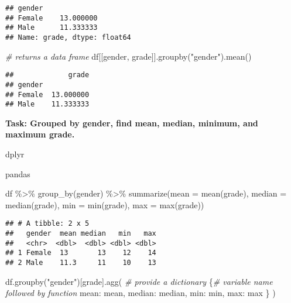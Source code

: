 \documentclass[
]{book}
\newenvironment{Shaded}{\begin{snugshade}}{\end{snugshade}}
\newcommand{\AttributeTok}[1]{\textcolor[rgb]{0.77,0.63,0.00}{#1}}
\newcommand{\CommentTok}[1]{\textcolor[rgb]{0.56,0.35,0.01}{\textit{#1}}}
\newcommand{\FunctionTok}[1]{\textcolor[rgb]{0.00,0.00,0.00}{#1}}
\newcommand{\NormalTok}[1]{#1}
\newcommand{\SpecialCharTok}[1]{\textcolor[rgb]{0.00,0.00,0.00}{#1}}
\newcommand{\StringTok}[1]{\textcolor[rgb]{0.31,0.60,0.02}{#1}}
\begin{document}
\begin{verbatim}
## gender
## Female    13.000000
## Male      11.333333
## Name: grade, dtype: float64
\end{verbatim}

\begin{Shaded}
\begin{Highlighting}[]
\CommentTok{\# returns a data frame}
\NormalTok{df[[}\StringTok{\textquotesingle{}gender\textquotesingle{}}\NormalTok{, }\StringTok{\textquotesingle{}grade\textquotesingle{}}\NormalTok{]].groupby(}\StringTok{"gender"}\NormalTok{).mean()}
\end{Highlighting}
\end{Shaded}

\begin{verbatim}
##             grade
## gender           
## Female  13.000000
## Male    11.333333
\end{verbatim}

{\textbf{Task: Grouped by gender, find mean, median, minimum, and maximum grade.
}}

dplyr

pandas

\begin{Shaded}
\begin{Highlighting}[]
\NormalTok{df }\SpecialCharTok{\%\textgreater{}\%} 
  \FunctionTok{group\_by}\NormalTok{(gender) }\SpecialCharTok{\%\textgreater{}\%} 
  \FunctionTok{summarize}\NormalTok{(}\AttributeTok{mean =} \FunctionTok{mean}\NormalTok{(grade),}
            \AttributeTok{median =} \FunctionTok{median}\NormalTok{(grade),}
            \AttributeTok{min =} \FunctionTok{min}\NormalTok{(grade),}
            \AttributeTok{max =} \FunctionTok{max}\NormalTok{(grade))}
\end{Highlighting}
\end{Shaded}

\begin{verbatim}
## # A tibble: 2 x 5
##   gender  mean median   min   max
##   <chr>  <dbl>  <dbl> <dbl> <dbl>
## 1 Female  13       13    12    14
## 2 Male    11.3     11    10    13
\end{verbatim}

\begin{Shaded}
\begin{Highlighting}[]
\NormalTok{df.groupby(}\StringTok{"gender"}\NormalTok{)[}\StringTok{\textquotesingle{}grade\textquotesingle{}}\NormalTok{].agg(}
  \CommentTok{\# provide a dictionary}
\NormalTok{  \{}\CommentTok{\# variable name followed by function}
    \StringTok{\textquotesingle{}mean\textquotesingle{}}\NormalTok{: }\StringTok{\textquotesingle{}mean\textquotesingle{}}\NormalTok{,}
    \StringTok{\textquotesingle{}median\textquotesingle{}}\NormalTok{: }\StringTok{\textquotesingle{}median\textquotesingle{}}\NormalTok{,}
    \StringTok{\textquotesingle{}min\textquotesingle{}}\NormalTok{: }\StringTok{\textquotesingle{}min\textquotesingle{}}\NormalTok{,}
    \StringTok{\textquotesingle{}max\textquotesingle{}}\NormalTok{: }\StringTok{\textquotesingle{}max\textquotesingle{}}
\NormalTok{  \}}
\NormalTok{)}
\end{Highlighting}
\end{Shaded}
\end{document}
